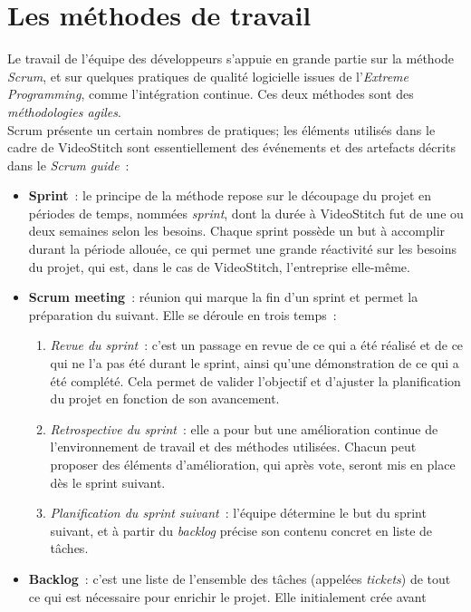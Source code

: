 \section{Les méthodes de travail}
Le travail de l'équipe des développeurs s'appuie en grande partie sur la méthode \emph{Scrum}, et
sur quelques pratiques de qualité logicielle issues de l'\textit{Extreme Programming}, comme l'intégration continue.
Ces deux méthodes sont des \emph{méthodologies agiles}\cite{methode-agile}.\\
\newline
Scrum présente un certain nombres de pratiques; les éléments utilisés 
dans le cadre de VideoStitch sont essentiellement des événements et des artefacts 
décrits dans le \textit{Scrum guide}\cite{scrum-guide}~:
\begin{itemize}
  \item \textbf{Sprint}~: le principe de la méthode repose sur le découpage du projet en 
	périodes de temps, nommées \emph{sprint}, dont la durée à VideoStitch fut de 
	une ou deux semaines selon les besoins. Chaque sprint possède un but à accomplir 
	durant la période allouée, ce qui permet une grande réactivité sur les besoins 
	du projet, qui est, dans le cas de VideoStitch, l'entreprise elle-même.
	\item \textbf{Scrum meeting}~: réunion qui marque la fin d'un sprint et permet la préparation 
	du suivant. Elle se déroule en trois temps~:
	\begin{enumerate}
		\item \textit{Revue du sprint}~: c'est un passage en revue de ce qui a été réalisé
		et de ce qui ne l'a pas été durant le sprint, ainsi qu'une démonstration 
		de ce qui a été complété. Cela permet de valider l'objectif et d'ajuster 
		la planification du projet en fonction de son avancement.
		\item \textit{Retrospective du sprint}~: elle a pour but une amélioration continue 
		de l'environnement de travail et des méthodes utilisées. Chacun peut proposer
		des éléments d'amélioration, qui après vote, seront mis en place dès le sprint
		suivant.
		\item \textit{Planification du sprint suivant}~: l'équipe détermine le but du sprint
		suivant, et à partir du \textit{backlog} précise son contenu concret en liste de tâches.
	\end{enumerate}
  \item \textbf{Backlog}~: c'est une liste de l'ensemble des tâches (appelées \emph{tickets})
  de tout ce qui est nécessaire pour enrichir le projet. Elle initialement crée avant

\end{itemize}
